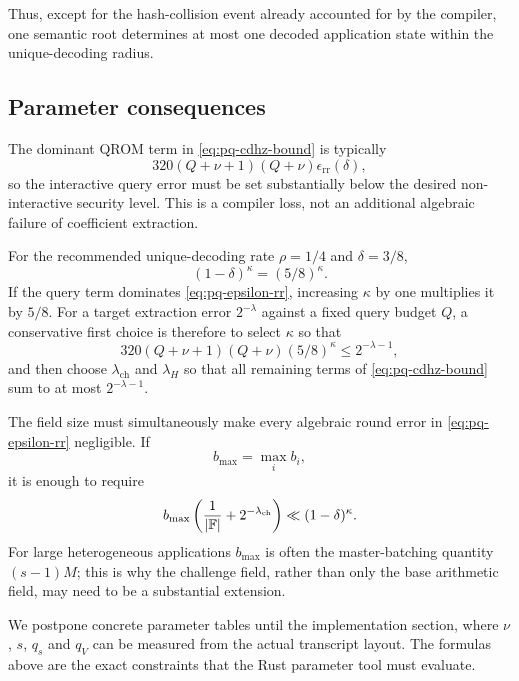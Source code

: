 Thus, except for the hash-collision event already accounted for by the compiler, one semantic root determines at most one decoded application state within the unique-decoding radius.

\subsection{Parameter consequences}
\label{sec:pq-parameters}

The dominant QROM term in \eqref{eq:pq-cdhz-bound} is typically
\begin{equation}
  320(Q+\nu+1)(Q+\nu)\epsilon_{\mathrm{rr}}(\delta),
  \label{eq:pq-dominant-term}
\end{equation}
so the interactive query error must be set substantially below the desired non-interactive security level.  This is a compiler loss, not an additional algebraic failure of coefficient extraction.

For the recommended unique-decoding rate $\rho=1/4$ and $\delta=3/8$,
\[
  (1-\delta)^\kappa=(5/8)^\kappa.
\]
If the query term dominates \eqref{eq:pq-epsilon-rr}, increasing $\kappa$ by one multiplies it by $5/8$.  For a target extraction error $2^{-\lambda}$ against a fixed query budget $Q$, a conservative first choice is therefore to select $\kappa$ so that
\begin{equation}
  320(Q+\nu+1)(Q+\nu)(5/8)^\kappa
  \le 2^{-\lambda-1},
  \label{eq:pq-kappa-choice}
\end{equation}
and then choose $\lambda_{\mathrm{ch}}$ and $\lambda_H$ so that all remaining terms of \eqref{eq:pq-cdhz-bound} sum to at most $2^{-\lambda-1}$.

The field size must simultaneously make every algebraic round error in \eqref{eq:pq-epsilon-rr} negligible.  If
\[
  b_{\max}=\max_i b_i,
\]
it is enough to require
\begin{equation}
  b_{\max}
  \left(\frac1{|\mathbb{F}|}+2^{-\lambda_{\mathrm{ch}}}\right)
  \ll (1-\delta)^\kappa.
  \label{eq:pq-field-choice}
\end{equation}
For large heterogeneous applications $b_{\max}$ is often the master-batching quantity $(s-1)M$; this is why the challenge field, rather than only the base arithmetic field, may need to be a substantial extension.

We postpone concrete parameter tables until the implementation section, where $\nu$, $s$, $q_s$ and $q_V$ can be measured from the actual transcript layout.  The formulas above are the exact constraints that the Rust parameter tool must evaluate.

